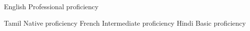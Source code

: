 
\begin{cvskills}

  \cvskill
    {English} %
    {Professional proficiency} %

  \cvskill
    {Tamil} %
    {Native proficiency} %
  \cvskill
    {French} %
    {Intermediate proficiency} %
  \cvskill
    {Hindi} %
    {Basic proficiency} %

\end{cvskills}
